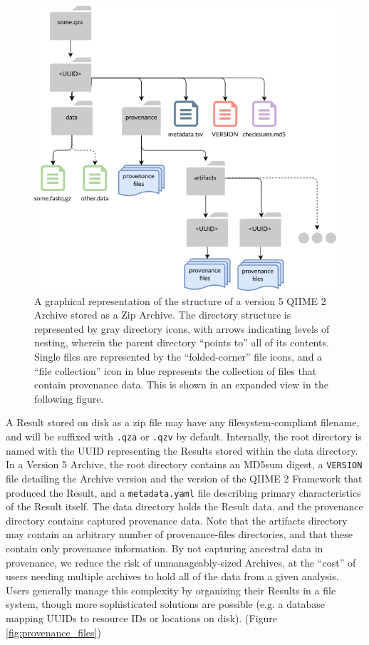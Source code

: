\begin{figure}[htbp]
\centering
\includegraphics[width=\textwidth]{figures/archive_structure.png}
\caption[Diagram of the structure of a version-5 QIIME 2 Archive]%
{A graphical representation of the structure of a version 5 QIIME 2 Archive
stored as a Zip Archive. The directory structure is represented by gray
directory icons, with arrows indicating levels of nesting, wherein the parent
directory “points to” all of its contents. Single files are represented by the
“folded-corner” file icons, and a “file collection” icon in blue represents the
collection of files that contain provenance data. This is shown in an expanded
view in the following figure.}
\label{fig:archive_structure}
\end{figure}
A Result stored on disk as a zip file may have any filesystem-compliant
filename, and will be suffixed with \texttt{.qza} or \texttt{.qzv} by default. Internally, the
root directory is named with the UUID representing the Results stored within the
data directory. In a Version 5 Archive, the root directory contains an MD5sum
digest, a \texttt{VERSION} file detailing the Archive version and the version of the
QIIME 2 Framework that produced the Result, and a \texttt{metadata.yaml} file describing
primary characteristics of the Result itself. The data directory holds the
Result data, and the provenance directory contains captured provenance data.
Note that the artifacts directory may contain an arbitrary number of
provenance-files directories, and that these contain only provenance
information. By not capturing ancestral data in provenance, we reduce the risk
of unmanageably-sized Archives, at the “cost” of users needing multiple archives
to hold all of the data from a given analysis. Users generally manage this
complexity by organizing their Results in a file system, though more
sophisticated solutions are possible (e.g. a database mapping UUIDs to resource
IDs or locations on disk). (Figure \ref{fig:provenance_files})


